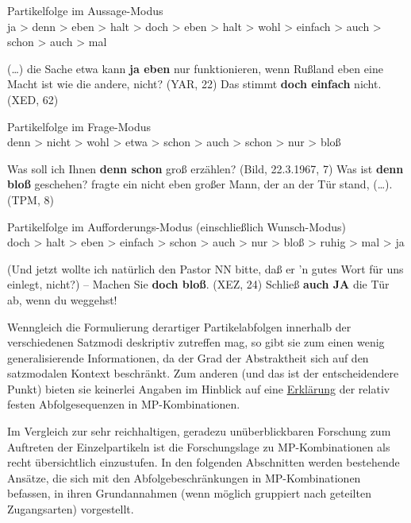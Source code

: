 \begin{exe}
	\ex\label{14} 
		Partikelfolge im Aussage-Modus \\
		ja > denn > eben > halt > doch > eben > halt > wohl > einfach > auch > schon > auch > mal 
	\begin{xlist}	
		\ex\label{14a}(\ldots) die Sache etwa kann \textbf{ja eben} nur funktionieren, wenn Rußland eben eine Macht ist wie die andere, nicht? (YAR, 22) 
		\ex\label{14b}Das stimmt \textbf{doch einfach} nicht. (XED, 62)
	\end{xlist}	
\end{exe}
\begin{exe}
	\ex\label{15} 
		Partikelfolge im Frage-Modus \\
		denn > nicht > wohl > etwa > schon > auch > schon > nur > bloß
	\begin{xlist}	
		\ex\label{15a} Was soll ich Ihnen \textbf{denn schon} groß erzählen? (Bild, 22.3.1967, 7)
		\ex\label{15b} \glqq Was ist \textbf{denn bloß} geschehen?\grqq{} fragte ein nicht eben großer Mann, der an der Tür stand, (\ldots). (TPM, 8)	
	\end{xlist}	
\end{exe}
	 	
\begin{exe}
	\ex\label{16} 
		Partikelfolge im Aufforderungs-Modus (einschließlich Wunsch-Modus) \\
		doch > halt > eben > einfach > schon > auch > nur > bloß > ruhig > mal > ja	
	\begin{xlist}	
		\ex\label{16a} (Und jetzt wollte ich natürlich den Pastor NN bitte, daß er 'n gutes Wort für uns einlegt, nicht?) – 				Machen Sie \textbf{doch bloß}. (XEZ, 24)
		\ex\label{16b} Schließ \textbf{auch JA} die Tür ab, wenn du weggehst!
	\end{xlist}			
\hfill\hbox{\citet[1542/1543]{Zifonun1997}}
\end{exe}
Wenngleich die Formulierung derartiger Partikelabfolgen innerhalb der verschie\-denen Satzmodi deskriptiv zutreffen mag, so gibt sie zum einen wenig genera\-lisierende Informationen, da der Grad der Abstraktheit sich auf den satzmodalen Kontext beschränkt. Zum anderen (und das ist der entscheidendere Punkt) bieten sie keinerlei Angaben im Hinblick auf eine \uline{Erklärung} der relativ festen Abfolgesequenzen in MP-Kombinationen.

Im Vergleich zur sehr reichhaltigen, geradezu unüberblickbaren Forschung zum Auftreten der Einzelpartikeln ist die Forschungslage zu MP-Kombinationen als recht übersichtlich einzustufen. In den folgenden Abschnitten werden bestehende Ansätze, die sich mit den Abfolgebeschränkungen in MP-Kombinationen befassen, in ihren Grundannahmen (wenn möglich gruppiert nach geteilten Zugangsarten) vorgestellt.
	 														 
